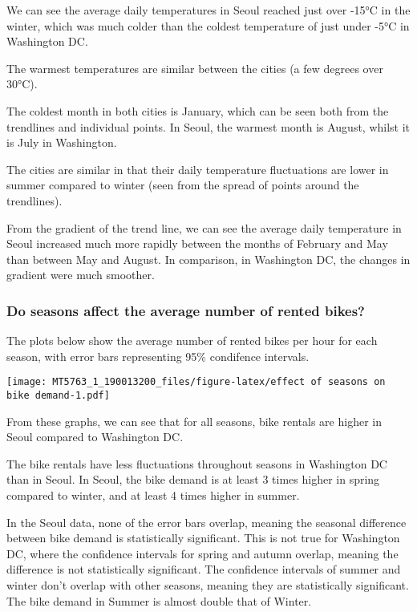 \documentclass[]{article}
\begin{document}
We can see the average daily temperatures in Seoul reached just over
-15°C in the winter, which was much colder than the coldest temperature
of just under -5°C in Washington DC.

The warmest temperatures are similar between the cities (a few degrees
over 30°C).

The coldest month in both cities is January, which can be seen both from
the trendlines and individual points. In Seoul, the warmest month is
August, whilst it is July in Washington.

The cities are similar in that their daily temperature fluctuations are
lower in summer compared to winter (seen from the spread of points
around the trendlines).

From the gradient of the trend line, we can see the average daily
temperature in Seoul increased much more rapidly between the months of
February and May than between May and August. In comparison, in
Washington DC, the changes in gradient were much smoother.

\hypertarget{do-seasons-affect-the-average-number-of-rented-bikes}{%
\subsubsection{Do seasons affect the average number of rented
bikes?}\label{do-seasons-affect-the-average-number-of-rented-bikes}}

The plots below show the average number of rented bikes per hour for
each season, with error bars representing 95\% condifence intervals.

\texttt{[image: MT5763\_1\_190013200\_files/figure-latex/effect of seasons on bike demand-1.pdf]}

From these graphs, we can see that for all seasons, bike rentals are
higher in Seoul compared to Washington DC.

The bike rentals have less fluctuations throughout seasons in Washington
DC than in Seoul. In Seoul, the bike demand is at least 3 times higher
in spring compared to winter, and at least 4 times higher in summer.

In the Seoul data, none of the error bars overlap, meaning the seasonal
difference between bike demand is statistically significant. This is not
true for Washington DC, where the confidence intervals for spring and
autumn overlap, meaning the difference is not statistically significant.
The confidence intervals of summer and winter don't overlap with other
seasons, meaning they are statistically significant. The bike demand in
Summer is almost double that of Winter.
\end{document}
